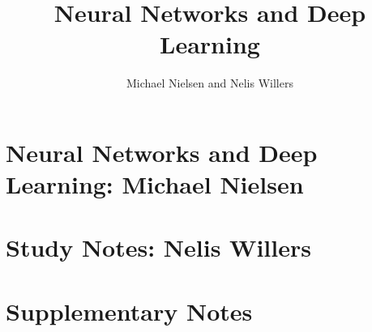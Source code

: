\documentclass[a4,nobib]{tufte-book}
\title{Neural Networks and Deep Learning}
\author[Michael Nielsen and Nelis Willers]{Michael Nielsen and Nelis Willers}
\begin{document}
\part{Neural Networks and Deep Learning: Michael Nielsen}
\part{Study Notes: Nelis Willers}
\part{Supplementary Notes}
\end{document}
